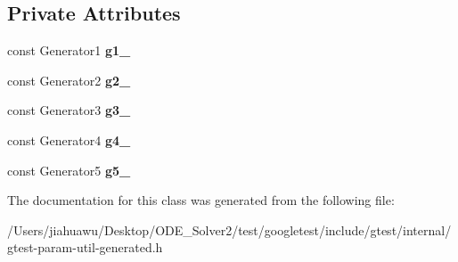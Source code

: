 \subsection*{Private Attributes}
\begin{DoxyCompactItemize}
\item 
\mbox{\label{classtesting_1_1internal_1_1_cartesian_product_holder5_a81bf8ba58a8f701efade5c1d18bc9dfa}} 
const Generator1 {\bfseries g1\+\_\+}
\item 
\mbox{\label{classtesting_1_1internal_1_1_cartesian_product_holder5_a57165b6e989e926177914113b9f98b06}} 
const Generator2 {\bfseries g2\+\_\+}
\item 
\mbox{\label{classtesting_1_1internal_1_1_cartesian_product_holder5_ae65dc0fd8fec8fbb393fe8ad978b825c}} 
const Generator3 {\bfseries g3\+\_\+}
\item 
\mbox{\label{classtesting_1_1internal_1_1_cartesian_product_holder5_a290ba6ef45af1b5e026aa298ac680ff1}} 
const Generator4 {\bfseries g4\+\_\+}
\item 
\mbox{\label{classtesting_1_1internal_1_1_cartesian_product_holder5_abff8a65f6a0fb6d5f1d8d9d5c3472b72}} 
const Generator5 {\bfseries g5\+\_\+}
\end{DoxyCompactItemize}


The documentation for this class was generated from the following file\+:\begin{DoxyCompactItemize}
\item 
/\+Users/jiahuawu/\+Desktop/\+O\+D\+E\+\_\+\+Solver2/test/googletest/include/gtest/internal/gtest-\/param-\/util-\/generated.\+h\end{DoxyCompactItemize}
